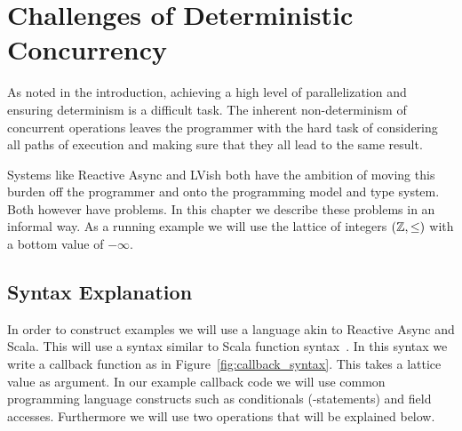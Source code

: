 \chapter{Challenges of Deterministic Concurrency}
\label{cha:challenges}





As noted in the introduction, achieving a high level of parallelization and
ensuring determinism is a difficult task. The inherent non-determinism of
concurrent operations leaves the programmer with the hard task of considering
all paths of execution and making sure that they all lead to the same result.

Systems like Reactive Async and LVish both have the ambition of moving this
burden off the programmer and onto the programming model and type system. Both
however have problems. In this chapter we describe these problems in an informal
way. As a running example we will use the lattice of integers $(\mathbb{Z},
\leq)$ with a bottom value of $-\infty$.


\section{Syntax Explanation}%
\label{sec:operations}

In order to construct examples we will use a language akin to Reactive Async and
Scala. This will use a syntax similar to Scala function
syntax~\parencite{scalabasics}. In this syntax we write a callback function as in
Figure~\ref{fig:callback_syntax}. This takes a lattice value  as
argument. In our example callback code we will use common programming language
constructs such as conditionals (-statements) and field accesses.
Furthermore we will use two operations that will be explained below.

